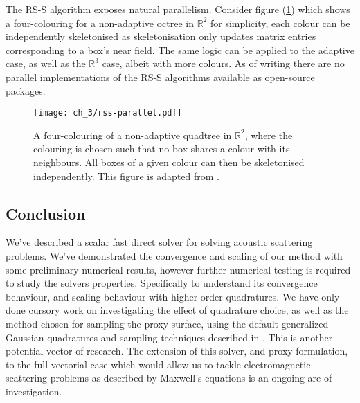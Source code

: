 The RS-S algorithm exposes natural parallelism. Consider figure (\ref{fig:sec_3_1:rss_parallel}) which shows a four-colouring for a non-adaptive octree in $\mathbb{R}^2$ for simplicity, each colour can be independently skeletonised as skeletonisation only updates matrix entries corresponding to a box's near field. The same logic can be applied to the adaptive case, as well as the $\mathbb{R}^3$ case, albeit with more colours. As of writing there are no parallel implementations of the RS-S algorithms available as open-source packages.

\begin{figure}
    \centering
    \texttt{[image: ch\_3/rss-parallel.pdf]}
    \caption{A four-colouring of a non-adaptive quadtree in $\mathbb{R}^2$, where the colouring is chosen such that no box shares a colour with its neighbours. All boxes of a given colour can then be skeletonised independently. This figure is adapted from \cite{minden2017recursive}.}
    \label{fig:sec_3_1:rss_parallel}
\end{figure}

\subsection*{Conclusion}

We've described a scalar fast direct solver for solving acoustic scattering problems. We've demonstrated the convergence and scaling of our method with some preliminary numerical results, however further numerical testing is required to study the solvers properties. Specifically to understand its convergence behaviour, and scaling behaviour with higher order quadratures. We have only done cursory work on investigating the effect of quadrature choice, as well as the method chosen for sampling the proxy surface, using the default generalized Gaussian quadratures and sampling techniques described in \cite{sushnikova2022fmm}. This is another potential vector of research. The extension of this solver, and proxy formulation, to the full vectorial case which would allow us to tackle electromagnetic scattering problems as described by Maxwell's equations is an ongoing are of investigation.